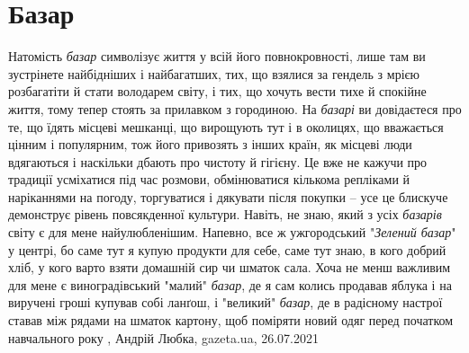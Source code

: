  
 
 
 
 
\chapter{Базар}

Натомість \emph{базар} символізує життя у всій його повнокровності, лише там ви
зустрінете найбідніших і найбагатших, тих, що взялися за гендель з мрією
розбагатіти й стати володарем світу, і тих, що хочуть вести тихе й спокійне
життя, тому тепер стоять за прилавком з городиною. На \emph{базарі} ви
довідаєтеся про те, що їдять місцеві мешканці, що вирощують тут і в околицях,
що вважається цінним і популярним, тож його привозять з інших країн, як місцеві
люди вдягаються і наскільки дбають про чистоту й гігієну. Це вже не кажучи про
традиції усміхатися під час розмови, обмінюватися кількома репліками й
наріканнями на погоду, торгуватися і дякувати після покупки – усе це блискуче
демонструє рівень повсякденної культури. Навіть, не знаю, який з усіх
\emph{базарів} світу є для мене найулюбленішим. Напевно, все ж ужгородський
"\emph{Зелений базар}" у центрі, бо саме тут я купую продукти для себе, саме
тут знаю, в кого добрий хліб, у кого варто взяти домашній сир чи шматок сала.
Хоча не менш важливим для мене є виноградівський "малий" \emph{базар}, де я сам
колись продавав яблука і на виручені гроші купував собі ланґош, і "великий"
\emph{базар}, де в радісному настрої ставав між рядами на шматок картону, щоб
поміряти новий одяг перед початком навчального року
, 
Андрій Любка, gazeta.ua, 26.07.2021
